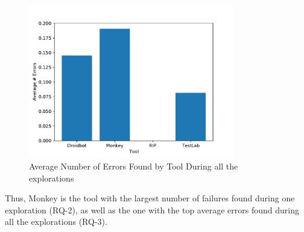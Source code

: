 \begin{figure}[h]
\centering
\includegraphics[width=0.8\textwidth]{../Figures/averageErrors.pdf}
\caption{Average Number of Errors Found by Tool During all the explorations}\label{fig:averagaerrors}
\end{figure}

Thus, Monkey is the tool with the largest number of failures found during one exploration (RQ-2), as well as the one with the top average errors found during all the explorations (RQ-3). 